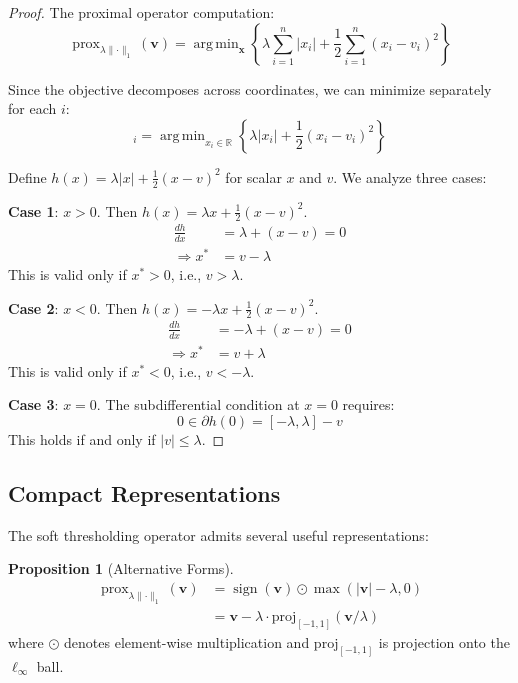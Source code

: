 \documentclass[12pt]{article}
\renewcommand{\vec}[1]{\mathbf{#1}}
\DeclareMathOperator{\argmin}{arg\,min}
\DeclareMathOperator{\prox}{prox}
\DeclareMathOperator{\sign}{sign}
\newcommand{\norm}[1]{\lVert #1 \rVert}
\newcommand{\abs}[1]{\lvert #1 \rvert}
\newcommand{\R}{\mathbb{R}}
\theoremstyle{definition}
\newtheorem{proposition}[theorem]{Proposition}
\begin{document}
\begin{proof}
    The proximal operator computation:
    \begin{equation}
        \prox_{\lambda\norm{\cdot}_1}(\vec{v}) = \argmin_{\vec{x}} \left\{ \lambda\sum_{i=1}^n \abs{x_i} + \frac{1}{2}\sum_{i=1}^n (x_i - v_i)^2 \right\}
    \end{equation}

    Since the objective decomposes across coordinates, we can minimize separately for each $i$:
    \begin{equation}
        [\prox_{\lambda\norm{\cdot}_1}(\vec{v})]_i = \argmin_{x_i \in \R} \left\{ \lambda\abs{x_i} + \frac{1}{2}(x_i - v_i)^2 \right\}
    \end{equation}

    Define $h(x) = \lambda\abs{x} + \frac{1}{2}(x - v)^2$ for scalar $x$ and $v$. We analyze three cases:

    \textbf{Case 1}: $x > 0$. Then $h(x) = \lambda x + \frac{1}{2}(x - v)^2$.
    \begin{align}
        \frac{dh}{dx}   & = \lambda + (x - v) = 0 \\
        \Rightarrow x^* & = v - \lambda
    \end{align}
    This is valid only if $x^* > 0$, i.e., $v > \lambda$.

    \textbf{Case 2}: $x < 0$. Then $h(x) = -\lambda x + \frac{1}{2}(x - v)^2$.
    \begin{align}
        \frac{dh}{dx}   & = -\lambda + (x - v) = 0 \\
        \Rightarrow x^* & = v + \lambda
    \end{align}
    This is valid only if $x^* < 0$, i.e., $v < -\lambda$.

    \textbf{Case 3}: $x = 0$. The subdifferential condition at $x = 0$ requires:
    \begin{equation}
        0 \in \partial h(0) = [-\lambda, \lambda] - v
    \end{equation}
    This holds if and only if $\abs{v} \leq \lambda$.
\end{proof}

\subsection{Compact Representations}

The soft thresholding operator admits several useful representations:

\begin{proposition}[Alternative Forms]
    \begin{align}
        \prox_{\lambda\norm{\cdot}_1}(\vec{v}) & = \sign(\vec{v}) \odot \max(\abs{\vec{v}} - \lambda, 0)         \\
                                               & = \vec{v} - \lambda \cdot \text{proj}_{[-1,1]}(\vec{v}/\lambda)
    \end{align}
    where $\odot$ denotes element-wise multiplication and $\text{proj}_{[-1,1]}$ is projection onto the $\ell_\infty$ ball.
\end{proposition}
\end{document}
